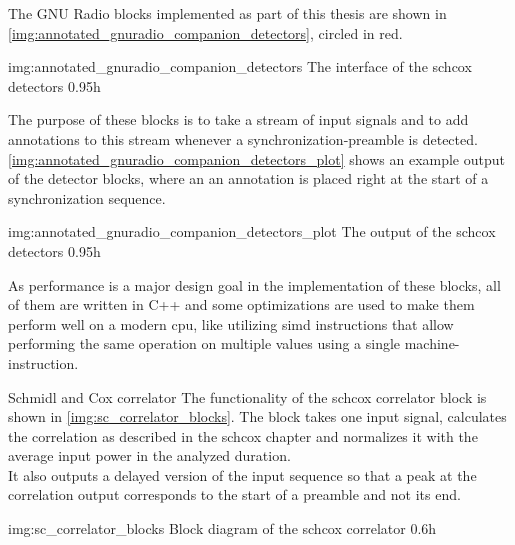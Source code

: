 The GNU Radio blocks implemented as part of this thesis are
shown in \autoref{img:annotated_gnuradio_companion_detectors},
circled in red.

             {img:annotated_gnuradio_companion_detectors}
             {The interface of the \gls{schcox} detectors}
             {0.95}{h}

The purpose of these blocks is to take a stream of input signals
and to add annotations to this stream whenever a synchronization-preamble
is detected.
\autoref{img:annotated_gnuradio_companion_detectors_plot} shows an example output
of the detector blocks, where an an annotation is placed right at the start of a
synchronization sequence.

             {img:annotated_gnuradio_companion_detectors_plot}
             {The output of the \gls{schcox} detectors}
             {0.95}{h}

As performance is a major design goal in the implementation of these blocks,
all of them are written in C++ and some optimizations are used to make them
perform well on a modern \acrshort{cpu}, like utilizing
\acrshort{simd} instructions that allow performing the same
operation on multiple values using a single machine-instruction.

\begin{subchapter}{Schmidl and Cox correlator}
  The functionality of the \acrlong{schcox} correlator
  block is shown in \autoref{img:sc_correlator_blocks}.
  The block takes one input signal, calculates the correlation
  as described in the \acrlong{schcox} chapter and normalizes it
  with the average input power in the analyzed duration. \\

  It also outputs a delayed version of the input sequence so that
  a peak at the correlation output corresponds to the start of a
  preamble and not its end.

               {img:sc_correlator_blocks}
               {Block diagram of the \acrlong{schcox} correlator}
               {0.6}{h}
\end{subchapter}

